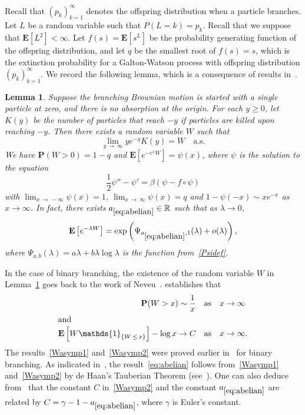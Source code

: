 \documentclass[10pt]{amsart}
\newtheorem{lemm}[theo]{Lemma}\newtheorem{prop}[theo]{Proposition}\newtheorem{coro}[theo]{Corollary}\newtheorem{conj}[theo]{Conjecture}
\theoremstyle{definition}\newtheorem{defi}[theo]{Definition}\newtheorem{rema}[theo]{Remark}\newtheorem{exam}[theo]{Example}\newtheorem{exem}[theo]{Example}\newtheorem{nota}[theo]{Notation}
\newcommand*\E{\mathbf{E}}
\renewcommand*\P{\mathbf{P}}
\newcommand*\R{\mathbb{R}}
\newcommand{\1} {\mathds{1}}
\renewcommand*\to{\rightarrow}
\begin{document}
Recall that $(p_k)_{k=1}^{\infty}$ denotes the offspring distribution when a particle branches. Let $L$ be a random variable such that $P(L = k) = p_k$. Recall that we suppose that $\E[L^2]<\infty$. Let $f(s) = \E[s^L]$ be the probability generating function of the offspring distribution, and let $q$ be the smallest root of $f(s) = s$, which is the extinction probability for a Galton-Watson process with offspring distribution $(p_k)_{k=1}^{\infty}$. We record the following lemma, which is a consequence of results in~\cite[Chapter~4]{thesis}.

\begin{lemm}\label{neveuW}
Suppose the branching Brownian motion is started with a single particle at zero, and there is no absorption at the origin. For each $y \geq 0$, let $K(y)$ be the number of particles that reach $-y$ if particles are killed upon reaching $-y$. Then there exists a random variable $W$ such that
\[
\lim_{y\,\rightarrow\,\infty} y e^{-y} K(y) = W \quad\text{a.s.}
\]
We have $\P(W > 0) = 1 - q$ and $\E[e^{-e^x W}] = \psi(x)$, where $\psi$ is the solution to the equation
\[
\frac{1}{2} \psi'' - \psi' = \beta\left(\psi - f \circ \psi\right)
\]
with $\lim_{x\,\rightarrow\,-\infty} \psi(x) = 1$, $\lim_{x \,\rightarrow\,\infty} \psi(x) = q$ and $1-\psi(-x)\sim xe^{-x}$ as $x\to\infty$. In fact, there exists $a_{\eqref{eq:abelian}}\in\R$ such that as $\lambda \to 0$,
\begin{equation}\label{eq:abelian}
\E\left[e^{-\lambda W}\right] = \exp\left(\Psi_{a_{\eqref{eq:abelian}},1}(\lambda) + o(\lambda)\right),
\end{equation}
where $\Psi_{a,b}(\lambda) = a\lambda + b\lambda \log \lambda$ is the function from~\eqref{Psidef}.
\end{lemm}

In the case of binary branching, the existence of the random variable $W$ in Lemma~\ref{neveuW} goes back to the work of Neveu~\cite{nev87}. \cite[Proposition~4.1 in Chapter~2]{thesis} establishes that
\begin{align}
\P(W > x) \sim \frac{1}{x}\quad  &\text{as}\quad x \rightarrow \infty
\label{Wasymp1}\\
\intertext{and}
\E\left[W \1_{\left\{W\,\leq\,x\right\}}\right] - \log x \rightarrow C\quad  &\text{as}\quad x \rightarrow \infty.\label{Wasymp2}
\end{align}
The results~\eqref{Wasymp1} and~\eqref{Wasymp2} were proved earlier in~\cite{bbs2} for binary branching. As indicated in~\cite{thesis}, the result~\eqref{eq:abelian} follows from~\eqref{Wasymp1} and~\eqref{Wasymp2} by de Haan's Tauberian Theorem (see~\cite[Theorem~2]{dh76}). One can also deduce from~\cite[Theorem~2]{dh76} that the constant $C$ in~\eqref{Wasymp2} and the constant $a_{\eqref{eq:abelian}}$ are related by $C = \gamma - 1 - a_{\eqref{eq:abelian}}$, where $\gamma$ is Euler's constant.
\end{document}

